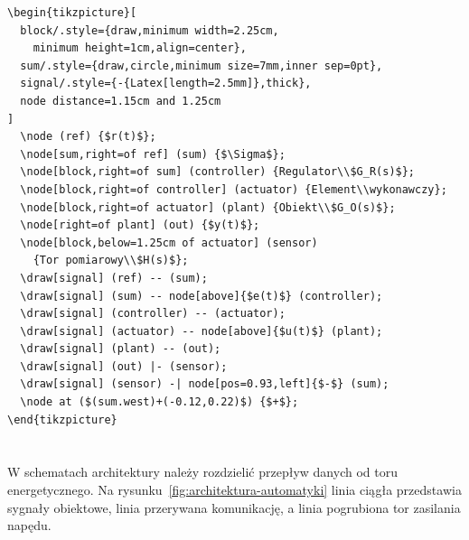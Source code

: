 \begin{lstlisting}[style=thesis,caption={Kod zamkniętej pętli układu regulacji},label={lst:tikz-bloki}]
\begin{tikzpicture}[
  block/.style={draw,minimum width=2.25cm,
    minimum height=1cm,align=center},
  sum/.style={draw,circle,minimum size=7mm,inner sep=0pt},
  signal/.style={-{Latex[length=2.5mm]},thick},
  node distance=1.15cm and 1.25cm
]
  \node (ref) {$r(t)$};
  \node[sum,right=of ref] (sum) {$\Sigma$};
  \node[block,right=of sum] (controller) {Regulator\\$G_R(s)$};
  \node[block,right=of controller] (actuator) {Element\\wykonawczy};
  \node[block,right=of actuator] (plant) {Obiekt\\$G_O(s)$};
  \node[right=of plant] (out) {$y(t)$};
  \node[block,below=1.25cm of actuator] (sensor)
    {Tor pomiarowy\\$H(s)$};
  \draw[signal] (ref) -- (sum);
  \draw[signal] (sum) -- node[above]{$e(t)$} (controller);
  \draw[signal] (controller) -- (actuator);
  \draw[signal] (actuator) -- node[above]{$u(t)$} (plant);
  \draw[signal] (plant) -- (out);
  \draw[signal] (out) |- (sensor);
  \draw[signal] (sensor) -| node[pos=0.93,left]{$-$} (sum);
  \node at ($(sum.west)+(-0.12,0.22)$) {$+$};
\end{tikzpicture}
\end{lstlisting}

\section{}

W schematach architektury należy rozdzielić przepływ danych od toru energetycznego.
Na rysunku~\ref{fig:architektura-automatyki} linia ciągła przedstawia sygnały obiektowe,
linia przerywana komunikację, a linia pogrubiona tor zasilania napędu.

